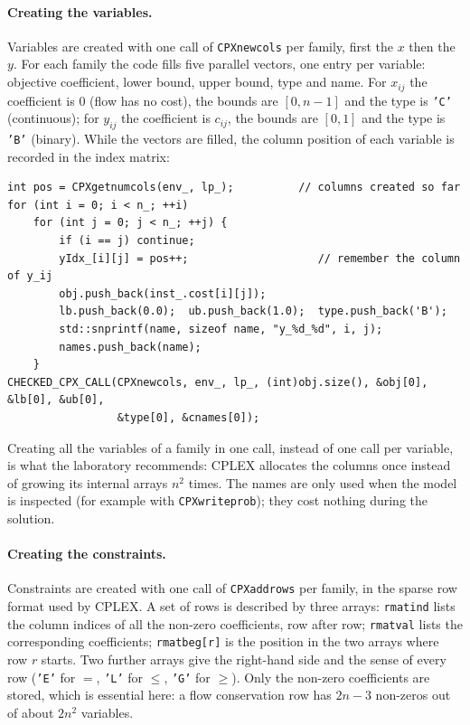 \documentclass[11pt,a4paper]{article}
\begin{document}
\paragraph{Creating the variables.}
Variables are created with one call of \texttt{CPXnewcols} per family, first the $x$ then the
$y$. For each family the code fills five parallel vectors, one entry per variable: objective
coefficient, lower bound, upper bound, type and name. For $x_{ij}$ the coefficient is 0 (flow
has no cost), the bounds are $[0,n-1]$ and the type is \texttt{'C'} (continuous); for $y_{ij}$
the coefficient is $c_{ij}$, the bounds are $[0,1]$ and the type is \texttt{'B'} (binary). While
the vectors are filled, the column position of each variable is recorded in the index matrix:
\begin{lstlisting}
int pos = CPXgetnumcols(env_, lp_);          // columns created so far
for (int i = 0; i < n_; ++i)
    for (int j = 0; j < n_; ++j) {
        if (i == j) continue;
        yIdx_[i][j] = pos++;                    // remember the column of y_ij
        obj.push_back(inst_.cost[i][j]);
        lb.push_back(0.0);  ub.push_back(1.0);  type.push_back('B');
        std::snprintf(name, sizeof name, "y_%d_%d", i, j);
        names.push_back(name);
    }
CHECKED_CPX_CALL(CPXnewcols, env_, lp_, (int)obj.size(), &obj[0], &lb[0], &ub[0],
                 &type[0], &cnames[0]);
\end{lstlisting}
Creating all the variables of a family in one call, instead of one call per variable, is
what the laboratory recommends: CPLEX allocates the columns once instead of growing its
internal arrays $n^2$ times. The names are only used when the model is inspected (for example
with \texttt{CPXwriteprob}); they cost nothing during the solution.

\paragraph{Creating the constraints.}
Constraints are created with one call of \texttt{CPXaddrows} per family, in the sparse row
format used by CPLEX. A set of rows is described by three arrays: \texttt{rmatind} lists the
column indices of all the non-zero coefficients, row after row; \texttt{rmatval} lists the
corresponding coefficients; \texttt{rmatbeg[r]} is the position in the two arrays where row
$r$ starts. Two further arrays give the right-hand side and the sense of every row
(\texttt{'E'} for $=$, \texttt{'L'} for $\le$, \texttt{'G'} for $\ge$). Only the non-zero
coefficients are stored, which is essential here: a flow conservation row has $2n-3$
non-zeros out of about $2n^2$ variables.
\end{document}
